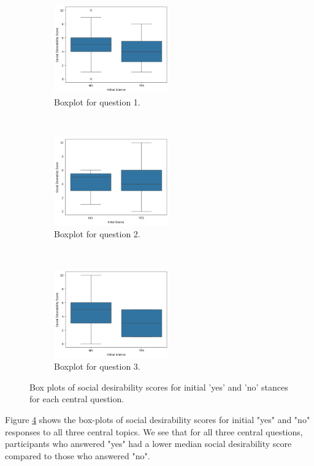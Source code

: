 \documentclass[journal]{IEEEtran}
\begin{document}
\begin{figure}[t!]
    \centering
    \begin{subfigure}[t]{0.3\textwidth}
        \centering
        \includegraphics[height=1.5in]{Fig/social_desirability_topic_33.png}
        \caption{Boxplot for question 1.}
        \label{graph:social-desirability-1}
    \end{subfigure}%
    ~
    \begin{subfigure}[t]{0.3\textwidth}
        \centering
        \includegraphics[height=1.5in]{Fig/social_desirability_topic_48.png}
        \caption{Boxplot for question 2.}
        \label{graph:social-desirability-2}
    \end{subfigure}%
    ~
    \begin{subfigure}[t]{0.3\textwidth}
        \centering
        \includegraphics[height=1.5in]{Fig/social_desirability_topic_73.png}
        \caption{Boxplot for question 3.}
        \label{graph:social-desirability-3}
    \end{subfigure}%
    \caption{Box plots of social desirability scores for initial 'yes' and 'no' stances for each central question.}
    \label{graph:social-desirability-all}
\end{figure}

Figure \ref{graph:social-desirability-all} shows the box-plots of social desirability scores for initial "yes" and "no" responses to all three central topics. We see that for all three central questions, participants who answered "yes" had a lower median social desirability score compared to those who answered "no".
\end{document}
